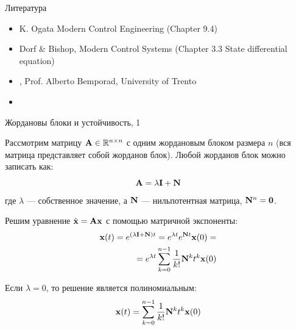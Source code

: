 \documentclass{beamer}
\begin{document}
\begin{frame}{Литература}

\begin{itemize}
	
	\item K. Ogata Modern Control Engineering (Chapter 9.4)
	
	\item Dorf \& Bishop, Modern Control Systems (Chapter 3.3 State differential equation)		
	
\item  {}, Prof. Alberto Bemporad, University of Trento

\item {}

\end{itemize}

\end{frame}



\myqrframe




\begin{frame}{Жордановы блоки и устойчивость, 1}
	\begin{flushleft}
		
		Рассмотрим матрицу $\mathbf{A} \in \mathbb{R}^{n \times n}$ с одним жордановым блоком размера $n$ (вся матрица представляет собой жорданов блок). Любой жорданов блок можно записать как:
		\begin{equation}
			\mathbf{A} = \lambda \mathbf{I} +\mathbf{N} 
		\end{equation}
		где $\lambda$ — собственное значение, а $\mathbf{N} $ — нильпотентная матрица, $\mathbf{N}^n = \mathbf{0}$.
		
		\bigskip
		
		Решим уравнение $\dot{\mathbf{x}} = \mathbf{A}\mathbf{x}$ с помощью матричной экспоненты:
		\begin{align}
			\mathbf{x} (t)= e^{(\lambda \mathbf{I} +\mathbf{N})t  }= e^{\lambda t} e^{\mathbf{N}t} \mathbf{x} (0)=
			\\
			=  e^{\lambda t} \sum_{k=0}^{n-1} \frac{1}{k!} \mathbf{N}^k t^k \mathbf{x} (0)
		\end{align}
		
		Если $\lambda = 0$, то решение является полиномиальным:
		\begin{align}
			\mathbf{x} (t)=  \sum_{k=0}^{n-1} \frac{1}{k!} \mathbf{N}^k t^k \mathbf{x} (0)
		\end{align}
		
	\end{flushleft}
\end{frame}
\end{document}
